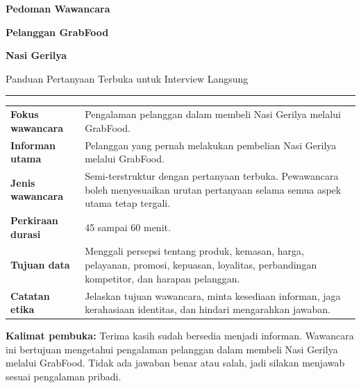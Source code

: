 \documentclass[10pt,a4paper]{article}
\begin{document}
\begin{titlepage}
\thispagestyle{empty}
\vspace*{9mm}
{\Huge\bfseries\textcolor{Primary}{Pedoman Wawancara}}\par
{\Huge\bfseries\textcolor{Primary}{Pelanggan GrabFood}}\par
{\Huge\bfseries\textcolor{Primary}{Nasi Gerilya}}\par
\vspace{3mm}
{\Large\textcolor{Accent}{Panduan Pertanyaan Terbuka untuk Interview Langsung}}\par
\vspace{7mm}
\textcolor{Accent}{\rule{0.92\linewidth}{1.4pt}}\par
\vspace{10mm}

\begin{tabularx}{\linewidth}{>{\bfseries\color{Primary}}p{38mm} Y}
Fokus wawancara & Pengalaman pelanggan dalam membeli Nasi Gerilya melalui GrabFood.\\
Informan utama & Pelanggan yang pernah melakukan pembelian Nasi Gerilya melalui GrabFood.\\
Jenis wawancara & Semi-terstruktur dengan pertanyaan terbuka. Pewawancara boleh menyesuaikan urutan pertanyaan selama semua aspek utama tetap tergali.\\
Perkiraan durasi & 45 sampai 60 menit.\\
Tujuan data & Menggali persepsi tentang produk, kemasan, harga, pelayanan, promosi, kepuasan, loyalitas, perbandingan kompetitor, dan harapan pelanggan.\\
Catatan etika & Jelaskan tujuan wawancara, minta kesediaan informan, jaga kerahasiaan identitas, dan hindari mengarahkan jawaban.\\
\end{tabularx}

\vfill
\colorbox{Soft}{%
  \parbox{\dimexpr\linewidth-2\fboxsep\relax}{%
    \raggedright
    \textbf{\textcolor{Primary}{Kalimat pembuka:}}
    Terima kasih sudah bersedia menjadi informan. Wawancara ini bertujuan mengetahui pengalaman pelanggan dalam membeli Nasi Gerilya melalui GrabFood. Tidak ada jawaban benar atau salah, jadi silakan menjawab sesuai pengalaman pribadi.
  }%
}
\vspace*{8mm}
\end{titlepage}
\end{document}
